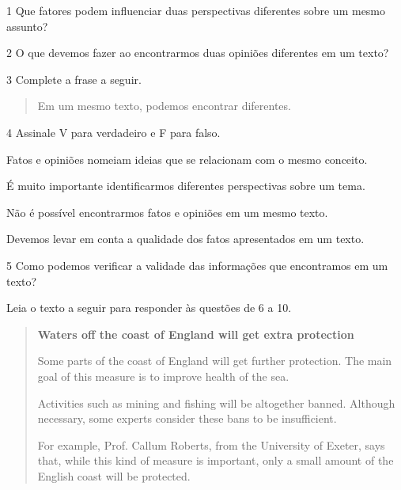 \num{1} Que fatores podem influenciar duas perspectivas diferentes sobre um
mesmo assunto?



\num{2} O que devemos fazer ao encontrarmos duas opiniões diferentes em um texto?



\num{3} Complete a frase a seguir.

\begin{quote}
Em um mesmo texto, podemos encontrar  diferentes.
\end{quote}

\num{4} Assinale V para verdadeiro e F para falso.

\begin{boxlist}
 Fatos e opiniões nomeiam ideias que se relacionam com o mesmo conceito.

 É muito importante identificarmos diferentes perspectivas sobre um tema.

 Não é possível encontrarmos fatos e opiniões em um mesmo texto.

 Devemos levar em conta a qualidade dos fatos apresentados em um texto.
\end{boxlist}

\num{5} Como podemos verificar a validade das informações que encontramos em um texto?


Leia o texto a seguir para responder às questões de 6 a 10.

\begin{quote}
\textbf{Waters off the coast of England will get extra protection}

Some parts of the coast of England will get further protection. The main goal of this measure is to improve health of the sea.

Activities such as mining and fishing will be altogether banned. Although necessary, some experts consider these bans to be insufficient.

For example, Prof. Callum Roberts, from the University of Exeter, says that, while this kind of measure is important, only a small amount of the English coast will be protected. 

\end{quote}


